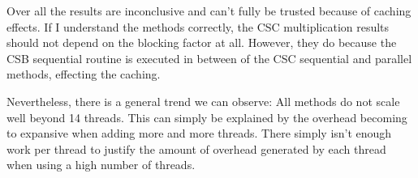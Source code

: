 \documentclass[a4paper, 11pt]{article}
\begin{document}
Over all the results are inconclusive and can't fully be trusted because of
caching effects. If I understand the methods correctly, the CSC multiplication
results should not depend on the blocking factor at all. However, they do
because the CSB sequential routine is executed in between of the CSC sequential
and parallel methods, effecting the caching. 

Nevertheless, there is a general trend we can observe: All methods do not scale
well beyond 14 threads. This can simply be explained by the overhead becoming
to expansive when adding more and more threads. There simply isn't enough work
per thread to justify the amount of overhead generated by each thread when
using a high number of threads.
\end{document}
